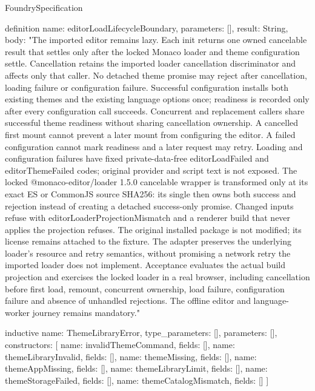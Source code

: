 \begin{lexlean}{FoundrySpecification}
\begin{semanticmodule}
definition{
  name: editorLoadLifecycleBoundary,
  parameters: [],
  result: String,
  body: "The imported editor remains lazy. Each init returns one owned cancelable result that settles only after the locked Monaco loader and theme configuration settle. Cancellation retains the imported loader cancellation discriminator and affects only that caller. No detached theme promise may reject after cancellation, loading failure or configuration failure. Successful configuration installs both existing themes and the existing language options once; readiness is recorded only after every configuration call succeeds. Concurrent and replacement callers share successful theme readiness without sharing cancellation ownership. A cancelled first mount cannot prevent a later mount from configuring the editor. A failed configuration cannot mark readiness and a later request may retry. Loading and configuration failures have fixed private-data-free editorLoadFailed and editorThemeFailed codes; original provider and script text is not exposed. The locked @monaco-editor/loader 1.5.0 cancelable wrapper is transformed only at its exact ES or CommonJS source SHA256: its single then owns both success and rejection instead of creating a detached success-only promise. Changed inputs refuse with editorLoaderProjectionMismatch and a renderer build that never applies the projection refuses. The original installed package is not modified; its license remains attached to the fixture. The adapter preserves the underlying loader's resource and retry semantics, without promising a network retry the imported loader does not implement. Acceptance evaluates the actual build projection and exercises the locked loader in a real browser, including cancellation before first load, remount, concurrent ownership, load failure, configuration failure and absence of unhandled rejections. The offline editor and language-worker journey remains mandatory."
}

inductive{
  name: ThemeLibraryError,
  type_parameters: [],
  parameters: [],
  constructors: [
    {name: invalidThemeCommand, fields: []},
    {name: themeLibraryInvalid, fields: []},
    {name: themeMissing, fields: []},
    {name: themeAppMissing, fields: []},
    {name: themeLibraryLimit, fields: []},
    {name: themeStorageFailed, fields: []},
    {name: themeCatalogMismatch, fields: []}
  ]
}


\end{semanticmodule}
\end{lexlean}

